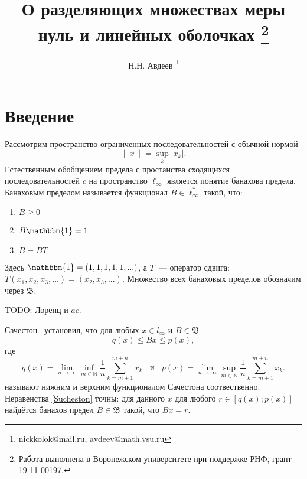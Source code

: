 \documentclass[a4paper,14pt]{article} %
\theoremstyle{plain}
\begin{document}

\title{
	О разделяющих множествах меры нуль и линейных оболочках
	\footnote{
		Работа выполнена в Воронежском университете при поддержке РНФ, грант 19-11-00197.
	}
}

\author{
	Н.Н. Авдеев
	\footnote{nickkolok@mail.ru, avdeev@math.vsu.ru}
}

\maketitle

\section{Введение}

Рассмотрим пространство ограниченных последовательностей с обычной нормой
\begin{equation*}
	\|x\| = \sup_{k} |x_k|
	.
\end{equation*}
Естественным обобщением предела с простанства сходящихся последовательностей $c$ на пространство $\ell_\infty$
является понятие банахова предела.
Банаховым пределом называется функционал $B\in \ell_\infty^*$ такой, что:
\begin{enumerate}
	\item
		$B \geqslant 0$
	\item
		$B\mathbbm{1} = 1$
	\item
		$B=BT$
\end{enumerate}
Здесь $\mathbbm{1}=(1,1,1,1,1,...)$,
а $T$~--- оператор сдвига: $T(x_1, x_2, x_3, ...) = (x_2, x_3, ...)$.
Множество всех банаховых пределов обозначим через $\mathfrak{B}$.

TODO: Лоренц и $ac$.

Сачестон~\cite{sucheston1967banach} установил, что
для любых $x\in l_\infty$ и $B\in\mathfrak{B}$
\begin{equation}\label{Sucheston}
	q(x) \leqslant Bx \leqslant p(x)
	,
\end{equation}
где
\begin{equation*}
	q(x) = \lim_{n\to\infty} \inf_{m\in\mathbb{N}}  \frac{1}{n} \sum_{k=m+1}^{m+n} x_k
	~~~~\mbox{и}~~~~
	p(x) = \lim_{n\to\infty} \sup_{m\in\mathbb{N}}  \frac{1}{n} \sum_{k=m+1}^{m+n} x_k
	.
\end{equation*}
называют нижним и верхним функционалом Сачестона соотвественно.
Неравенства \eqref{Sucheston} точны:
для данного $x$ для любого $r\in[q(x); p(x)]$ найдётся банахов предел
$B\in\mathfrak{B}$ такой, что $Bx = r$.
\end{document}
